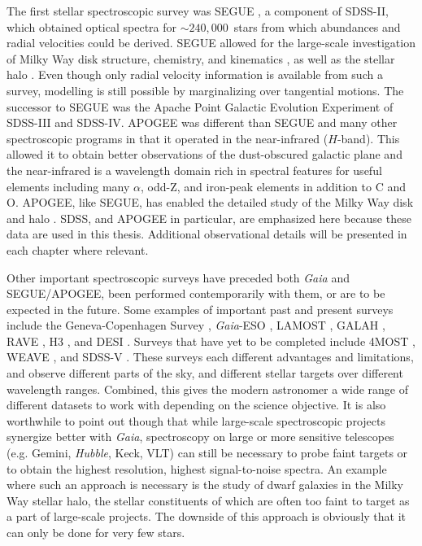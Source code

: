 The first stellar spectroscopic survey was SEGUE \parencite{segue}, a component of SDSS-II, which obtained optical spectra for $\sim 240,000$~stars from which abundances and radial velocities could be derived. SEGUE allowed for the large-scale investigation of Milky Way disk structure, chemistry, and kinematics \parencite[e.g.][]{bovy12c,bovy12d,schonrich12,bovy13}, as well as the stellar halo \parencite[e.g.][]{ivezic08,bond10}. Even though only radial velocity information is available from such a survey, modelling is still possible by marginalizing over tangential motions. The successor to SEGUE was the Apache Point Galactic Evolution Experiment \parencite[APOGEE][]{apogee} of SDSS-III and SDSS-IV. APOGEE was different than SEGUE and many other spectroscopic programs in that it operated in the near-infrared ($H$-band). This allowed it to obtain better observations of the dust-obscured galactic plane and the near-infrared is a wavelength domain rich in spectral features for useful elements including many $\alpha$, odd-Z, and iron-peak elements in addition to C and O. APOGEE, like SEGUE, has enabled the detailed study of the Milky Way disk and halo \parencite[see][for a few examples of noteworthy results]{bovy12a,hayden15,mackereth19a}. SDSS, and APOGEE in particular, are emphasized here because these data are used in this thesis. Additional observational details will be presented in each chapter where relevant.

Other important spectroscopic surveys have preceded both \textit{Gaia} and SEGUE/APOGEE, been performed contemporarily with them, or are to be expected in the future. Some examples of important past and present surveys include the Geneva-Copenhagen Survey \parencite{gcs}, \textit{Gaia}-ESO \parencite{gaiaeso}, LAMOST \parencite{lamost}, GALAH \parencite{galah}, RAVE \parencite{ravedr16}, H3 \parencite{h3}, and DESI \parencite{desi}. Surveys that have yet to be completed include 4MOST \parencite{4most}, WEAVE \parencite{weave}, and SDSS-V \parencite{sdss5}. These surveys each different advantages and limitations, and observe different parts of the sky, and different stellar targets over different wavelength ranges. Combined, this gives the modern astronomer a wide range of different datasets to work with depending on the science objective. It is also worthwhile to point out though that while large-scale spectroscopic projects synergize better with \textit{Gaia}, spectroscopy on large or more sensitive telescopes (e.g. Gemini, \textit{Hubble}, Keck, VLT) can still be necessary to probe faint targets or to obtain the highest resolution, highest signal-to-noise spectra. An example where such an approach is necessary is the study of dwarf galaxies in the Milky Way stellar halo, the stellar constituents of which are often too faint to target as a part of large-scale projects. The downside of this approach is obviously that it can only be done for very few stars.


